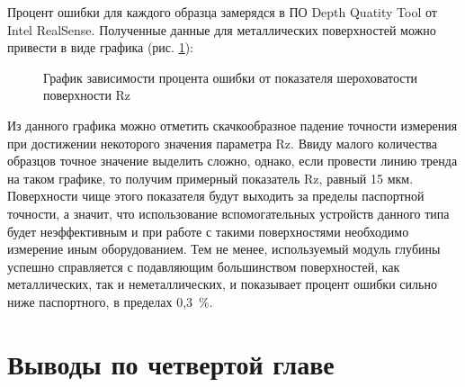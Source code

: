 Процент ошибки для каждого образца замерядся в ПО Depth Quatity Tool от Intel RealSense. Полученные данные для металлических поверхностей можно привести в виде графика (рис. \cref{fig:plot-rz}):

\begin{figure}[ht]
	\caption{График зависимости процента ошибки от показателя шероховатости поверхности Rz}\label{fig:plot-rz}
\end{figure}

Из данного графика можно отметить скачкообразное падение точности измерения при достижении некоторого значения параметра Rz. Ввиду малого количества образцов точное значение выделить сложно, однако, если провести линию тренда на таком графике, то получим примерный показатель Rz, равный 15 мкм. Поверхности чище этого показателя будут выходить за пределы паспортной точности, а значит, что использование вспомогательных устройств данного типа будет неэффективным и при работе с такими поверхностями необходимо измерение иным оборудованием. Тем не менее, используемый модуль глубины успешно справляется с подавляющим большинством поверхностей, как металлических, так и неметаллических, и показывает процент ошибки сильно ниже паспортного, в пределах 0,3~\%.

\section{Выводы по четвертой главе} \label{sect4_5}